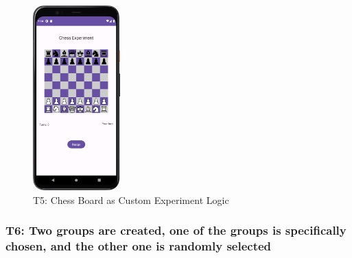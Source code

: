 \begin{figure}[htbp]
    \centering
    \includegraphics[width=0.3\textwidth, keepaspectratio]{content/07_evaluation_of_the_solution/Screenshot_Chess.png}
    \caption{T5: Chess Board as Custom Experiment Logic}    
    \label{fig:chess}
\end{figure}

\newpage



\subsubsection*{T6: Two groups are created, one of the groups is specifically chosen, and the other one is randomly selected}


